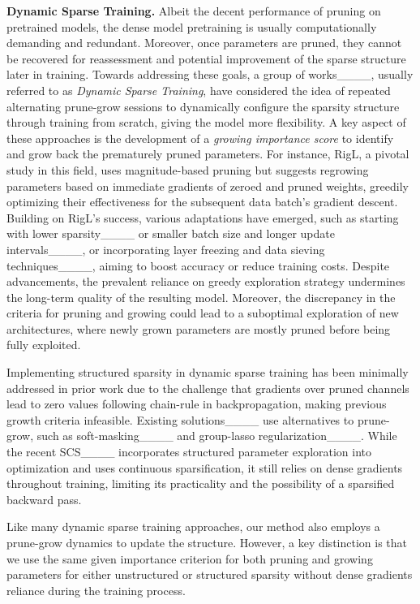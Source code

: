 \noindent\textbf{Dynamic Sparse Training.}
Albeit the decent performance of pruning on pretrained models, the dense model pretraining is usually computationally demanding and redundant. Moreover, once parameters are pruned, they cannot be recovered for reassessment and potential improvement of the sparse structure later in training. Towards addressing these goals,  a group of works____, usually referred to as \textit{Dynamic Sparse Training}, have considered the idea of repeated alternating prune-grow sessions to dynamically configure the sparsity structure through training from scratch, giving the model more flexibility. A key aspect of these approaches is the development of a \emph{growing importance score} to identify and grow back the prematurely pruned parameters. For instance, RigL, a pivotal study in this field, uses magnitude-based pruning but suggests regrowing parameters based on immediate gradients of zeroed and pruned weights, greedily optimizing their effectiveness for the subsequent data batch's gradient descent. Building on RigL's success, various adaptations have emerged, such as starting with lower sparsity____ or smaller batch size and longer update intervals____, or incorporating layer freezing and data sieving techniques____, aiming to boost accuracy or reduce training costs. Despite advancements, the prevalent reliance on greedy exploration strategy undermines the long-term quality of the resulting model. Moreover, the discrepancy in the criteria for pruning and growing could lead to a suboptimal exploration of new architectures, where newly grown parameters are mostly pruned before being fully exploited.

Implementing structured sparsity in dynamic sparse training has been minimally addressed in prior work due to the challenge that gradients over pruned channels lead to zero values following chain-rule in backpropagation, making previous growth criteria infeasible. Existing solutions____ use alternatives to prune-grow, such as soft-masking____ and group-lasso regularization____. While the recent SCS____ incorporates structured parameter exploration into optimization and uses continuous sparsification, it still relies on dense gradients throughout training, limiting its practicality and the possibility of a sparsified backward pass.

Like many dynamic sparse training approaches, our method also employs a prune-grow dynamics to update the structure. However, a key distinction is that we use the same given importance criterion for both pruning and growing parameters for either unstructured or structured sparsity without dense gradients reliance during the training process.